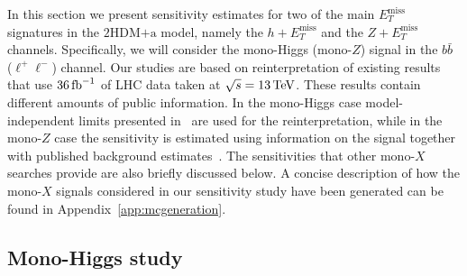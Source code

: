 \documentclass[a4paper, 11pt,notoc]{article}
\newcommand{\MET}{\ensuremath{E_T^\mathrm{miss}}\xspace}
\newcommand{\hdma}{\ensuremath{\textrm{2HDM+a}}\xspace}
\begin{document}
In this section we present sensitivity estimates for two of the main $\MET$ signatures in the \hdma model, namely the $h +\MET$  and the $Z+\MET$ channels. Specifically, we will consider the mono-Higgs (mono-$Z$) signal in the $b \bar b$ ($\ell^+ \ell^-$) channel.  {\color{red} Our studies are based on reinterpretation of existing results that use $36 \, {\rm fb}^{-1}$ of LHC data taken at $\sqrt{s} = 13 \, {\rm TeV}$. These results contain different amounts of public information. In the mono-Higgs case model-independent limits presented in~\cite{Aaboud:2017yqz} are used for the reinterpretation, while in the mono-$Z$ case  the sensitivity is estimated using information on the signal together with published background estimates~\cite{Aaboud:2017bja}.}  The sensitivities that other mono-$X$ searches provide are also briefly discussed below.  A concise description of how the  mono-$X$ signals considered in our sensitivity study have been generated  can be found in Appendix~\ref{app:mcgeneration}.

\subsection{Mono-Higgs study}
\label{sec:sensi_monohbb}
\end{document}
